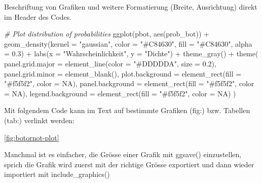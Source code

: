 \documentclass[
  11pt,
]{article}
\newenvironment{Shaded}{\begin{snugshade}}{\end{snugshade}}
\newcommand{\AttributeTok}[1]{\textcolor[rgb]{0.77,0.63,0.00}{#1}}
\newcommand{\CommentTok}[1]{\textcolor[rgb]{0.56,0.35,0.01}{\textit{#1}}}
\newcommand{\ConstantTok}[1]{\textcolor[rgb]{0.00,0.00,0.00}{#1}}
\newcommand{\FloatTok}[1]{\textcolor[rgb]{0.00,0.00,0.81}{#1}}
\newcommand{\FunctionTok}[1]{\textcolor[rgb]{0.00,0.00,0.00}{#1}}
\newcommand{\NormalTok}[1]{#1}
\newcommand{\SpecialCharTok}[1]{\textcolor[rgb]{0.00,0.00,0.00}{#1}}
\newcommand{\StringTok}[1]{\textcolor[rgb]{0.31,0.60,0.02}{#1}}
\begin{document}
Beschriftung von Grafiken und weitere Formatierung (Breite, Ausrichtung) direkt im Header des Codes.

\small

\linespread{1}

\begin{Shaded}
\begin{Highlighting}[]
\CommentTok{\# Plot distribution of probabilities}
\FunctionTok{ggplot}\NormalTok{(pbot, }\FunctionTok{aes}\NormalTok{(prob\_bot)) }\SpecialCharTok{+} 
  \FunctionTok{geom\_density}\NormalTok{(}\AttributeTok{kernel =} \StringTok{"gaussian"}\NormalTok{, }\AttributeTok{color =} \StringTok{"\#C84630"}\NormalTok{, }\AttributeTok{fill =} \StringTok{"\#C84630"}\NormalTok{, }\AttributeTok{alpha =} \FloatTok{0.3}\NormalTok{) }\SpecialCharTok{+}
  \FunctionTok{labs}\NormalTok{(}\AttributeTok{x =} \StringTok{"Wahrscheinlichkeit"}\NormalTok{, }\AttributeTok{y =} \StringTok{"Dichte"}\NormalTok{)  }\SpecialCharTok{+} 
  \FunctionTok{theme\_gray}\NormalTok{() }\SpecialCharTok{+}
  \FunctionTok{theme}\NormalTok{(}
    \AttributeTok{panel.grid.major =} \FunctionTok{element\_line}\NormalTok{(}\AttributeTok{color =} \StringTok{"\#DDDDDA"}\NormalTok{, }\AttributeTok{size =} \FloatTok{0.2}\NormalTok{),}
      \AttributeTok{panel.grid.minor =} \FunctionTok{element\_blank}\NormalTok{(),}
      \AttributeTok{plot.background =} \FunctionTok{element\_rect}\NormalTok{(}\AttributeTok{fill =} \StringTok{"\#f5f5f2"}\NormalTok{, }\AttributeTok{color =} \ConstantTok{NA}\NormalTok{), }
      \AttributeTok{panel.background =} \FunctionTok{element\_rect}\NormalTok{(}\AttributeTok{fill =} \StringTok{"\#f5f5f2"}\NormalTok{, }\AttributeTok{color =} \ConstantTok{NA}\NormalTok{), }
      \AttributeTok{legend.background =} \FunctionTok{element\_rect}\NormalTok{(}\AttributeTok{fill =} \StringTok{"\#f5f5f2"}\NormalTok{, }\AttributeTok{color =} \ConstantTok{NA}\NormalTok{)}
\NormalTok{  )}
\end{Highlighting}
\end{Shaded}

\linespread{1.5}

\normalsize

Mit folgendem Code kann im Text auf bestimmte Grafiken (fig:) bzw. Tabellen (tab:) verlinkt werden:

\ref{fig:botornot-plot}

Manchmal ist es einfacher, die Grösse einer Grafik mit ggsave() einzustellen, sprich die Grafik wird zuerst mit der richtige Grösse exportiert und dann wieder importiert mit include\_graphics()
\end{document}
